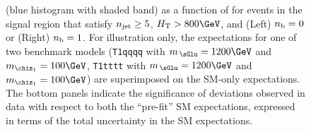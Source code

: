 \begin{figure}[tbhp]
{    (blue histogram with shaded band) as a function of \HTmiss for
    events in the signal region that satisfy $\njet \geq 5$, $\scalht
    > 800\GeV$, and (Left) $\nb = 0$ or (Right) $\nb = 1$. For
    illustration only, the expectations for one of two benchmark
    models (\texttt{T1qqqq} with $m_{\,\sGlu} = 1200\GeV$ and
    $m_{\chiz_1} = 100\GeV$, \texttt{T1tttt} with $m_{\,\sGlu} =
    1200\GeV$ and $m_{\chiz_1} = 100\GeV$) are superimposed on the
    SM-only expectations. The bottom panels indicate the significance
    of deviations observed in data with respect to both the
    ``pre-fit'' SM expectations, expressed in terms of the total
    uncertainty in the SM expectations. }
    \label{fig:mht-templates} 
\end{figure}
